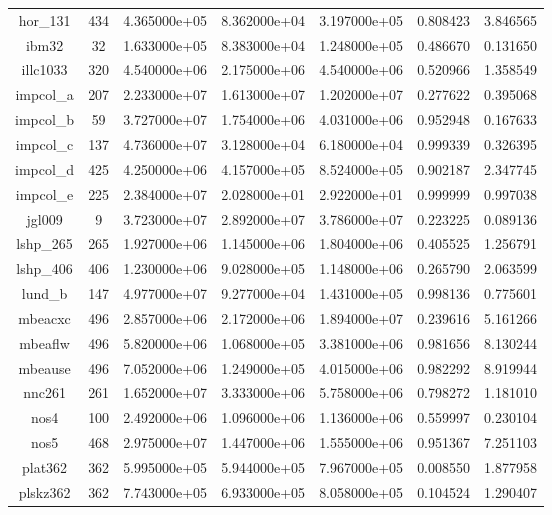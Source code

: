 \begin{table}[h]
\begin{tabular}{c|c|c|c|cc|c}
    hor\_131 & 434 & 4.365000e+05 & 8.362000e+04 & 3.197000e+05 & 0.808423 &
    3.846565\\
    ibm32 & 32 & 1.633000e+05 & 8.383000e+04 & 1.248000e+05 & 0.486670 &
    0.131650\\
    illc1033 & 320 & 4.540000e+06 & 2.175000e+06 & 4.540000e+06 & 0.520966 &
    1.358549\\
    impcol\_a & 207 & 2.233000e+07 & 1.613000e+07 & 1.202000e+07 & 0.277622 &
    0.395068\\
    impcol\_b & 59 & 3.727000e+07 & 1.754000e+06 & 4.031000e+06 & 0.952948 &
    0.167633\\
    impcol\_c & 137 & 4.736000e+07 & 3.128000e+04 & 6.180000e+04 & 0.999339 &
    0.326395\\
    impcol\_d & 425 & 4.250000e+06 & 4.157000e+05 & 8.524000e+05 & 0.902187 &
    2.347745\\
    impcol\_e & 225 & 2.384000e+07 & 2.028000e+01 & 2.922000e+01 & 0.999999 &
    0.997038\\
    jgl009 & 9 & 3.723000e+07 & 2.892000e+07 & 3.786000e+07 & 0.223225 &
    0.089136\\
    lshp\_265 & 265 & 1.927000e+06 & 1.145000e+06 & 1.804000e+06 & 0.405525 &
    1.256791\\
    lshp\_406 & 406 & 1.230000e+06 & 9.028000e+05 & 1.148000e+06 & 0.265790 &
    2.063599\\
    lund\_b & 147 & 4.977000e+07 & 9.277000e+04 & 1.431000e+05 & 0.998136 &
    0.775601\\
    mbeacxc & 496 & 2.857000e+06 & 2.172000e+06 & 1.894000e+07 & 0.239616 &
    5.161266\\
    mbeaflw & 496 & 5.820000e+06 & 1.068000e+05 & 3.381000e+06 & 0.981656 &
    8.130244\\
    mbeause & 496 & 7.052000e+06 & 1.249000e+05 & 4.015000e+06 & 0.982292 &
    8.919944\\
    nnc261 & 261 & 1.652000e+07 & 3.333000e+06 & 5.758000e+06 & 0.798272 &
    1.181010\\
    nos4 & 100 & 2.492000e+06 & 1.096000e+06 & 1.136000e+06 & 0.559997 &
    0.230104\\
    nos5 & 468 & 2.975000e+07 & 1.447000e+06 & 1.555000e+06 & 0.951367 &
    7.251103\\
    plat362 & 362 & 5.995000e+05 & 5.944000e+05 & 7.967000e+05 & 0.008550 &
    1.877958\\
    plskz362 & 362 & 7.743000e+05 & 6.933000e+05 & 8.058000e+05 & 0.104524 &
    1.290407\\

\end{tabular}
\end{table}
